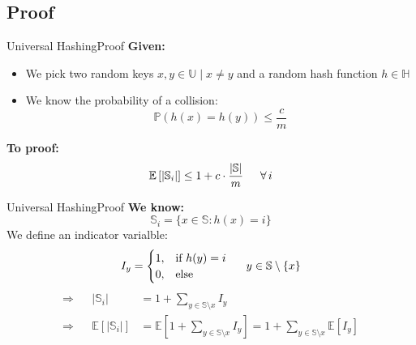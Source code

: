 \subsection{Proof}

\begin{frame}{Universal Hashing}{Proof}
  \textbf{Given:}
  \begin{itemize}
    \item
      We pick two random keys $x, y \in \mathbb{U} \mid x \neq y$ and
      a random hash function $h \in \mathbb{H}$
    \item
      We know the probability of a collision:
      \[\mathbb{P}(h(x) = h(y)) \leq \frac{c}{m}\]
  \end{itemize}
  \textbf{To proof:}
  \[\mathbb{E}\left[\vert \mathbb{S}_i \vert\right]
     \leq 1 + c \cdot \frac{\vert \mathbb{S} \vert}{m}
     \hspace*{1.5em} \forall \, i\]
\end{frame}


\begin{frame}{Universal Hashing}{Proof}
  \textbf{We know:}
  \[\mathbb{S}_i = \{x \in \mathbb{S}: h(x) = i\}\]
  We define an indicator varialble:
  \[I_y = \begin{cases}
    1, & \text{if } h(y) = i\\
    0, & \text{else}
  \end{cases} \hspace*{1.5em} y \in \mathbb{S} \setminus \{x\}\]
  \begin{align*}
    \Rightarrow && \vert \mathbb{S}_i \vert
      & = 1 + \sum_{y \in \mathbb{S} \setminus x} I_y\\
    \Rightarrow && \mathbb{E}\left[\vert \mathbb{S}_i \vert\right]
      & = \mathbb{E}\left[1 + \sum_{y \in \mathbb{S} \setminus x} I_y\right]
        = 1 + \sum_{y \in \mathbb{S} \setminus x} \mathbb{E}[I_y]
  \end{align*}
\end{frame}


